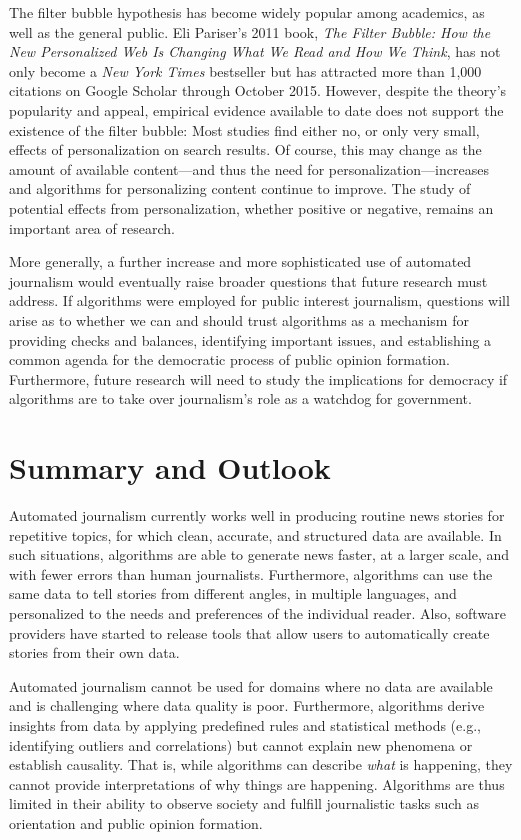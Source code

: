 \documentclass[notoc, symmetric, nobib, nols]{towcenter-guideto-book}
\begin{document}
The filter bubble hypothesis has become widely popular among academics, as well as the general public. Eli Pariser's 2011 book, \textit{The Filter Bubble: How the New Personalized Web Is Changing What We Read and How We Think},\autocite{paris11} has not only become a \textit{New York Times} bestseller but has attracted more than 1,000 citations on Google Scholar through October 2015. However, despite the theory's popularity and appeal, empirical evidence available to date does not support the existence of the filter bubble: Most studies find either no, or only very small, effects of personalization on search results.\autocites{bak15, flax15, haim15, feuz11} Of course, this may change as the amount of available content---and thus the need for personalization---increases and algorithms for personalizing content continue to improve. The study of potential effects from personalization, whether positive or negative, remains an important area of research.

More generally, a further increase and more sophisticated use of automated journalism would eventually raise broader questions that future research must address. If algorithms were employed for public interest journalism, questions will arise as to whether we can and should trust algorithms as a mechanism for providing checks and balances, identifying important issues, and establishing a common agenda for the democratic process of public opinion formation. Furthermore, future research will need to study the implications for democracy if algorithms are to take over journalism's role as a watchdog for government.  

\chapter{Summary and Outlook}

Automated journalism currently works well in producing routine news stories for repetitive topics, for which clean, accurate, and structured data are available. In such situations, algorithms are able to generate news faster, at a larger scale, and with fewer errors than human journalists. Furthermore, algorithms can use the same data to tell stories from different angles, in multiple languages, and personalized to the needs and preferences of the individual reader. Also, software providers have started to release tools that allow users to automatically create stories from their own data.

Automated journalism cannot be used for domains where no data are available and is challenging where data quality is poor. Furthermore, algorithms derive insights from data by applying predefined rules and statistical methods (e.g., identifying outliers and correlations) but cannot explain new phenomena or establish causality. That is, while algorithms can describe \textit{what} is happening, they cannot provide interpretations of why things are happening. Algorithms are thus limited in their ability to observe society and fulfill journalistic tasks such as orientation and public opinion formation. 
\end{document}
